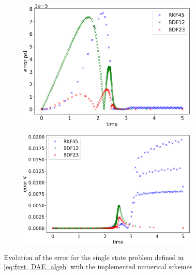 \documentclass{report}
\begin{document}
\begin{figure}[H]
    \centering
    \begin{subfigure}{0.43\textwidth}
    	\centering
    	\includegraphics[width=1\textwidth]{images/timeEvolutionPSIerror.png}
        \label{fig:timeEvolutionErrorPSI}
    \end{subfigure}
    \begin{subfigure}{0.43\textwidth}
    	\centering
    	\includegraphics[width=1\textwidth]{images/timeEvolutionVerror.png}
        \label{fig:timeEvolutionVerror}
    \end{subfigure}
    \caption{Evolution of the error for the single state problem defined in \autoref{eq:first_DAE_algeb} with the implemented numerical schemes}
\end{figure}
\end{document}
